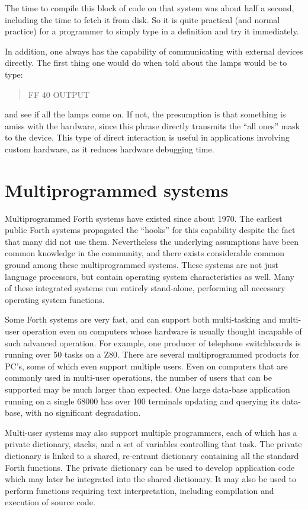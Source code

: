 The time to compile this block of code on that system was about half
a second, including the time to fetch it from disk. So it is quite
practical (and normal practice) for a programmer to simply type in a
definition and try it immediately.

In addition, one always has the capability of communicating with
external devices directly. The first thing one would do when told
about the lamps would be to type:
\begin{quote}\ttfamily
	 FF 40 OUTPUT
\end{quote}
and see if all the lamps come on. If not, the presumption is that
something is amiss with the hardware, since this phrase directly
transmits the ``all ones'' mask to the device. This type of direct
interaction is useful in applications involving custom hardware, as
it reduces hardware debugging time.


\section{Multiprogrammed systems} %

Multiprogrammed Forth systems have existed since about 1970. The
earliest public Forth systems propagated the ``hooks'' for this
capability despite the fact that many did not use them. Nevertheless
the underlying assumptions have been common knowledge in the community,
and there exists considerable common ground among these multiprogrammed
systems. These systems are not just language processors, but contain
operating system characteristics as well. Many of these integrated
systems run entirely stand-alone, performing all necessary operating
system functions.

Some Forth systems are very fast, and can support both multi-tasking
and multi-user operation even on computers whose hardware is usually
thought incapable of such advanced operation. For example, one
producer of telephone switchboards is running over 50 tasks on a Z80.
There are several multiprogrammed products for PC's, some of which
even support multiple users. Even on computers that are commonly used
in multi-user operations, the number of users that can be supported
may be much larger than expected. One large data-base application
running on a single 68000 has over 100 terminals updating and querying
its data-base, with no significant degradation.

Multi-user systems may also support multiple programmers, each of
which has a private dictionary, stacks, and a set of variables
controlling that task. The private dictionary is linked to a shared,
re-entrant dictionary containing all the standard Forth functions.
The private dictionary can be used to develop application code which
may later be integrated into the shared dictionary. It may also be
used to perform functions requiring text interpretation, including
compilation and execution of source code.


